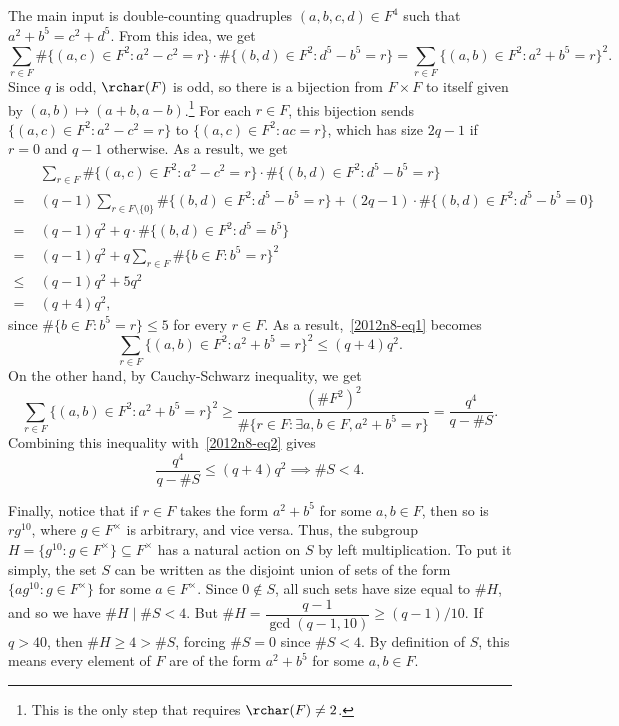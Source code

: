 The main input is double-counting quadruples $(a, b, c, d) \in F^4$ such that $a^2 + b^5 = c^2 + d^5$.
From this idea, we get
\[ \sum_{r \in F} \#\{(a, c) \in F^2 : a^2 - c^2 = r\} \cdot \#\{(b, d) \in F^2 : d^5 - b^5 = r\} = \sum_{r \in F} \{(a, b) \in F^2 : a^2 + b^5 = r\}^2. \tag{1}\label{2012n8-eq1} \]
Since $q$ is odd, $\rchar(F)$ is odd, so there is a bijection from $F \times F$ to itself given by $(a, b) \mapsto (a + b, a - b)$.\footnote{This is the only step that requires $\rchar(F) \neq 2$.}
For each $r \in F$, this bijection sends $\{(a, c) \in F^2 : a^2 - c^2 = r\}$ to $\{(a, c) \in F^2 : ac = r\}$, which has size $2q - 1$ if $r = 0$ and $q - 1$ otherwise.
As a result, we get
\begin{align*}
  & \sum_{r \in F} \#\{(a, c) \in F^2 : a^2 - c^2 = r\} \cdot \#\{(b, d) \in F^2 : d^5 - b^5 = r\} \\
  =\;& (q - 1) \sum_{r \in F \setminus \{0\}} \#\{(b, d) \in F^2 : d^5 - b^5 = r\} + (2q - 1) \cdot \#\{(b, d) \in F^2 : d^5 - b^5 = 0\} \\
  =\;& (q - 1) q^2 + q \cdot \#\{(b, d) \in F^2 : d^5 = b^5\} \\
  =\;& (q - 1) q^2 + q \sum_{r \in F} \#\{b \in F : b^5 = r\}^2 \\
  \leq\;& (q - 1) q^2 + 5q^2 \\
  =\;& (q + 4) q^2,
\end{align*}
  since $\#\{b \in F : b^5 = r\} \leq 5$ for every $r \in F$.
As a result,~\eqref{2012n8-eq1} becomes
\[ \sum_{r \in F} \{(a, b) \in F^2 : a^2 + b^5 = r\}^2 \leq (q + 4) q^2. \tag{2}\label{2012n8-eq2} \]
On the other hand, by Cauchy-Schwarz inequality, we get
\[ \sum_{r \in F} \{(a, b) \in F^2 : a^2 + b^5 = r\}^2 \geq \frac{(\#F^2)^2}{\#\{r \in F : \exists a, b \in F, a^2 + b^5 = r\}} = \frac{q^4}{q - \#S}. \]
Combining this inequality with~\eqref{2012n8-eq2} gives
\[ \frac{q^4}{q - \#S} \leq (q + 4) q^2 \implies \#S < 4. \]

Finally, notice that if $r \in F$ takes the form $a^2 + b^5$ for some $a, b \in F$, then so is $rg^{10}$, where $g \in F^{\times}$ is arbitrary, and vice versa.
Thus, the subgroup $H = \{g^{10} : g \in F^{\times}\} \subseteq F^{\times}$ has a natural action on $S$ by left multiplication.
To put it simply, the set $S$ can be written as the disjoint union of sets of the form $\{ag^{10} : g \in F^{\times}\}$ for some $a \in F^{\times}$.
Since $0 \notin S$, all such sets have size equal to $\#H$, and so we have $\#H \mid \#S < 4$.
But $\#H = \dfrac{q - 1}{\gcd(q - 1, 10)} \geq (q - 1)/10$.
If $q > 40$, then $\#H \geq 4 > \#S$, forcing $\#S = 0$ since $\#S < 4$.
By definition of $S$, this means every element of $F$ are of the form $a^2 + b^5$ for some $a, b \in F$.




